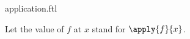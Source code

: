 \documentclass{article}
\begin{document}
\begin{smodule}[creators={Marcel Schütz}]{application.ftl}

  \begin{fconvention*}
    Let the value of $f$ at $x$ stand for $\apply{f}{x}$.
  \end{fconvention*}
\end{smodule}
\end{document}

